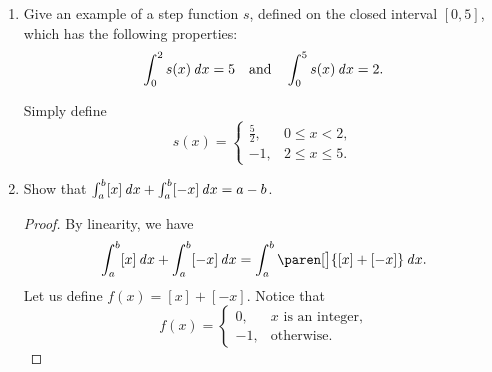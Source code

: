 \documentclass[a4paper]{article}
\begin{document}
\begin{enumerate}
\item Give an example of a step function \(s\), defined on the closed
  interval \([0, 5]\), which has the following properties:
  \[
    \int_0^2 s(x) \mathop{}\!\mathit{d} x = 5
    \quad \text{and} \quad
    \int_0^5 s(x) \mathop{}\!\mathit{d} x = 2.
  \]

  Simply define
  \[
    s(x) = \begin{cases}
      \frac52, & 0 \le x < 2, \\[1ex]
      -1,      & 2 \le x \le 5.
    \end{cases}
  \]

\item Show that \(\int_a^b [x] \mathop{}\!\mathit{d} x + \int_a^b [-x] \mathop{}\!\mathit{d} x = a-b\).

  \begin{proof}
    By linearity, we have
    \[
      \int_a^b [x] \dx + \int_a^b [-x] \dx
        = \int_a^b \paren[\big]{[x] + [-x]} \dx.
    \]
    Let us define \(f(x) = [x] + [-x]\).  Notice that
    \[
      f(x) =
      \begin{cases}
        0, & x \text{ is an integer,} \\
        -1, & \text{otherwise.}
      \end{cases}
    \]


\end{proof}
\end{enumerate}
\end{document}
